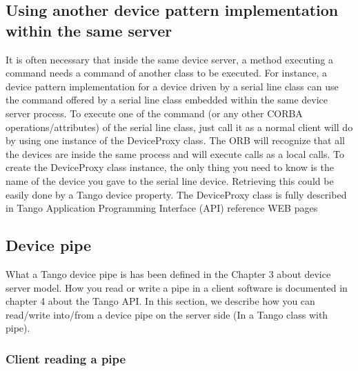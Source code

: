 \subsection{Using another device pattern implementation within the same server}

It is often necessary that inside the same device server,
a method executing a command needs a command of another class to be
executed. For instance, a device pattern implementation for a device
driven by a serial line class can use the command offered by a serial
line class embedded within the same device server process. To execute
one of the command (or any other CORBA operations/attributes)
of the serial line class, just call it as a normal client will do
by using one instance of the DeviceProxy class\emph{.} The ORB will
recognize that all the devices are inside the same process and will
execute calls as a local calls. To create the DeviceProxy
class instance, the only thing you need to know is the name of the
device you gave to the serial line device. Retrieving this could be
easily done by a Tango device property. The DeviceProxy class is fully
described in Tango Application Programming Interface (API) reference
WEB pages


\subsection{Device pipe}

What a Tango device pipe is has been defined in the Chapter 3 about
device server model. How you read or write a pipe in a client software
is documented in chapter 4 about the Tango API. In this section, we
describe how you can read/write into/from a device pipe on the server
side (In a Tango class with pipe).


\subsubsection{Client reading a pipe}

